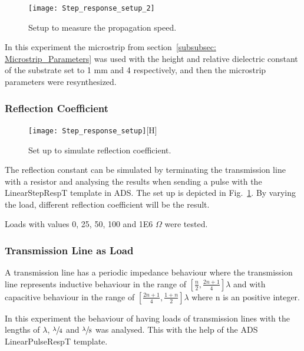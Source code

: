 \documentclass[report.tex]{subfiles}
\begin{document}
\begin{figure}[H]
	\texttt{[image: Step\_response\_setup\_2]}
	\caption{Setup to measure the propagation speed.}
\end{figure}

In this experiment the microstrip from section~\ref{subsubsec: Microstrip_Parameters} was used with the height and relative dielectric constant of the substrate set to 1 mm and 4 respectively, and then the microstrip parameters were resynthesized.

\subsubsection{Reflection Coefficient}

\begin{figure}[h]
	\texttt{[image: Step\_response\_setup]}[H]
	\caption{Set up to simulate reflection coefficient.}\label{fig:Lab1 reflection coefficient}
\end{figure}

The reflection constant can be simulated by terminating the transmission line with a resistor and analysing the results when sending a pulse with the LinearStepRespT template in ADS. The set up is depicted in Fig.~\ref{fig:Lab1 reflection coefficient}. By varying the load, different reflection coefficient will be the result.

Loads with values 0, 25, 50, 100 and 1E6 $\Omega$ were tested.

\subsubsection{Transmission Line as Load}
A transmission line has a periodic impedance behaviour where the transmission line represents inductive behaviour in the range of $\left[ \frac{n}{2},\frac{2n + 1}{4} \right]\lambda$ and with capacitive behaviour in the range of $\left[\frac{2n + 1}{4},\frac{1 + n}{2} \right]\lambda$ where n is an positive integer.

In this experiment the behaviour of having loads of transmission lines with the lengths of $\lambda$, $\sfrac{\lambda}{4}$ and $\sfrac{\lambda}{8}$ was analysed. This with the help of the ADS LinearPulseRespT template.
\end{document}
